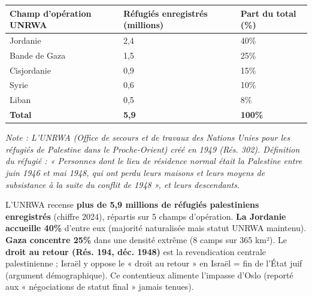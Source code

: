 \documentclass[11pt]{article}
\begin{document}
\begin{definition}
\begin{center}
\begin{tabularx}{\linewidth}{|l|X|X|}\hline
\textbf{Champ d'opération UNRWA} & \textbf{Réfugiés enregistrés (millions)} & \textbf{Part du total (\%)} \\ \hline
Jordanie & 2,4 & 40\% \\ \hline
Bande de Gaza & 1,5 & 25\% \\ \hline
Cisjordanie & 0,9 & 15\% \\ \hline
Syrie & 0,6 & 10\% \\ \hline
Liban & 0,5 & 8\% \\ \hline
\textbf{Total} & \textbf{5,9} & \textbf{100\%} \\ \hline
\end{tabularx}
\end{center}
\textit{Note : L'UNRWA (Office de secours et de travaux des Nations Unies pour les réfugiés de Palestine dans le Proche-Orient) créé en 1949 (Rés. 302). Définition du réfugié : « Personnes dont le lieu de résidence normal était la Palestine entre juin 1946 et mai 1948, qui ont perdu leurs maisons et leurs moyens de subsistance à la suite du conflit de 1948 », et leurs descendants.}
\end{definition}

\begin{exemplebox}
L'UNRWA recense \textbf{plus de 5,9 millions de réfugiés palestiniens enregistrés} (chiffre 2024), répartis sur 5 champs d'opération. \textbf{La Jordanie accueille 40\%} d'entre eux (majorité naturalisée mais statut UNRWA maintenu). \textbf{Gaza concentre 25\%} dans une densité extrême (8 camps sur 365 km²). Le \textbf{droit au retour (Rés. 194, déc. 1948)} est la revendication centrale palestinienne ; Israël y oppose le « droit au retour » en Israël = fin de l'État juif (argument démographique). Ce contentieux alimente l'impasse d'Oslo (reporté aux « négociations de statut final » jamais tenues).
\end{exemplebox}
\end{document}
